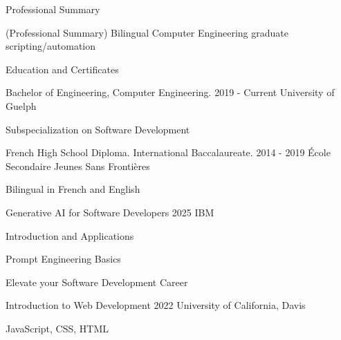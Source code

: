 \documentclass{resume}
\begin{document}
    \begin{rSection}{Professional Summary}
        \begin{center}
            (Professional Summary) Bilingual Computer Engineering graduate scripting/automation
        \end{center}

    \end{rSection}

    \begin{rSection}{Education and Certificates}
        \begin{rSubsection}
        {Bachelor of Engineering, Computer Engineering.}            {2019 - Current}
        {University of Guelph}                                      {}
            \item Subspecialization on Software Development
        \end{rSubsection}
        
        \begin{rSubsection}
        {French High School Diploma. International Baccalaureate.}  {2014 - 2019}
        {École Secondaire Jeunes Sans Frontières}                   {}
            \item Bilingual in French and English
        \end{rSubsection}
        
        \begin{rSubsection}
        {Generative AI for Software Developers}                     {2025}
        {IBM}                                                       {}
            \item Introduction and Applications
            \item Prompt Engineering Basics
            \item Elevate your Software Development Career
        \end{rSubsection}
        
        \begin{rSubsection}
        {Introduction to Web Development}                           {2022}
        {University of California, Davis}                           {}
         \item JavaScript, CSS, HTML
        \end{rSubsection}
    \end{rSection}
\end{document}
